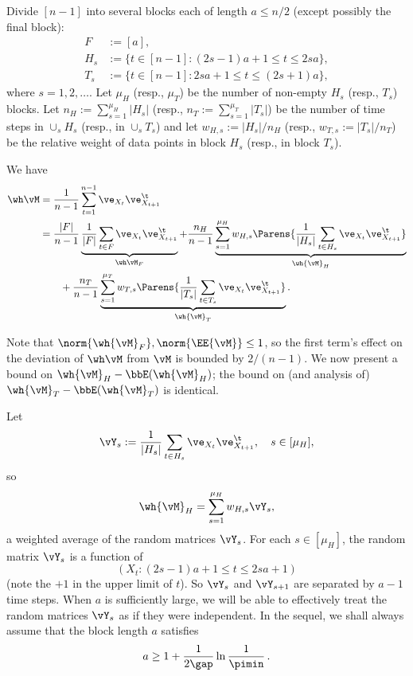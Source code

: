 Divide $[n-1]$ into several blocks each of length $a \leq n/2$ (except 
possibly the final block):
\begin{align*}
  F & := [a] , \\
  H_s & := \{ t \in [n-1] : (2s-1)a + 1 \leq t \leq 2sa \} , \\
  T_s & := \{ t \in [n-1] : 2sa + 1 \leq t \leq (2s+1) a \} ,
\end{align*}
where $s=1,2,\dots$.
Let $\mu_H$ (resp., $\mu_T$) be the number of non-empty $H_s$ (resp., $T_s$)
blocks.
Let $n_H := \sum_{s=1}^{\mu_H} |H_s|$ (resp., $n_T := \sum_{s=1}^{\mu_T}|T_s|$)
be the number of time steps in $\cup_s H_s$ (resp., in $\cup_s T_s$) and let
 $w_{H,s} := |H_s|/n_H$ (resp., $w_{T,s} := |T_s|/n_T$) be the relative weight of data points in block $H_s$
 (resp., in block $T_s$).

We have
\begin{align*}
  \wh\vM
  & = \frac1{n-1} \sum_{t=1}^{n-1} \ve_{X_t} \ve_{X_{t+1}}^\t \\
  & = \frac{|F|}{n-1} 
    \underbrace{
      \frac{1}{|F|} \sum_{t\in F} \ve_{X_t} \ve_{X_{t+1}}^\t
     }_{\wh\vM_F} +
  \frac{n_H}{n-1}
  \underbrace{
    \sum_{s=1}^{\mu_H} w_{H,s}
    \Parens{
      \frac1{|H_s|} \sum_{t \in H_s} \ve_{X_t} \ve_{X_{t+1}}^\t
    }
  }_{\wh{\vM}_H}\\
  & \qquad
  + \frac{n_T}{n-1}
  \underbrace{
    \sum_{s=1}^{\mu_T} w_{T,s}
    \Parens{
      \frac1{|T_s|} \sum_{t \in T_s} \ve_{X_t} \ve_{X_{t+1}}^\t
    }
  }_{\wh{\vM}_T}
  .
\end{align*}

Note that $\norm{\wh{\vM}_F},\norm{\EE{\vM}}\le 1$, so the first term's effect on the deviation of $\wh \vM$ from $\vM$ is bounded by $2/(n-1)$.
We now present a bound on $\wh{\vM}_H - \bbE(\wh{\vM}_H)$; the bound on (and analysis of)
 $\wh{\vM}_T - \bbE(\wh{\vM}_T)$ is identical.

Let
\[
  \vY_s := \frac1{|H_s|} \sum_{t \in H_s} \ve_{X_t} \ve_{X_{t+1}}^\t ,
  \quad s \in [\mu_H] ,
\]
so
\[
  \wh{\vM}_H = \sum_{s=1}^{\mu_H} w_{H,s} \vY_s ,
\]
a weighted average of the random matrices $\vY_s$.
For each $s \in [\mu_H]$, the random matrix $\vY_s$ is a function of
\[ (X_t : (2s-1)a + 1 \leq t \leq 2sa + 1) \]
(note the $+1$ in the upper limit of $t$).
So $\vY_s$ and $\vY_{s+1}$ are separated by $a-1$ time steps.
When $a$ is sufficiently large, we will be able to effectively treat
the random matrices $\vY_s$ as if they were independent.
In the sequel, we shall always assume that the block length $a$
satisfies
\begin{equation}
  \label{eq:block-length}
  a \geq
   1 + \frac{1}{2\gap} \ln \frac1{\pimin}\,.
\end{equation}

